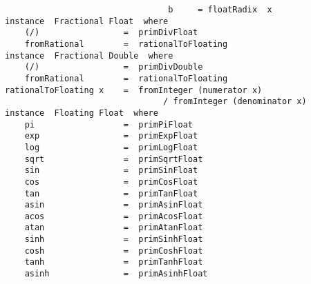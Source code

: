 \mbox{\tt \ \ \ \ \ \ \ \ \ \ \ \ \ \ \ \ \ \ \ \ \ \ \ \ \ \ \ \ \ \ \ \ \ b\ \ \ \ \ =\ floatRadix\ \ x}
\eprogB\noindent\bprogB
\mbox{\tt instance\ \ Fractional\ Float\ \ where}\\
\mbox{\tt \ \ \ \ (/)\ \ \ \ \ \ \ \ \ \ \ \ \ \ \ \ \ =\ \ primDivFloat}\\
\mbox{\tt \ \ \ \ fromRational\ \ \ \ \ \ \ \ =\ \ rationalToFloating}
\eprogB\noindent\bprogB
\mbox{\tt instance\ \ Fractional\ Double\ \ where}\\
\mbox{\tt \ \ \ \ (/)\ \ \ \ \ \ \ \ \ \ \ \ \ \ \ \ \ =\ \ primDivDouble}\\
\mbox{\tt \ \ \ \ fromRational\ \ \ \ \ \ \ \ =\ \ rationalToFloating}
\eprogB\noindent\bprogB
\mbox{\tt rationalToFloating\ x\ \ \ \ =\ \ fromInteger\ (numerator\ x)}\\
\mbox{\tt \ \ \ \ \ \ \ \ \ \ \ \ \ \ \ \ \ \ \ \ \ \ \ \ \ \ \ \ \ \ \ \ /\ fromInteger\ (denominator\ x)}
\eprogB\noindent\bprogB
\mbox{\tt instance\ \ Floating\ Float\ \ where}\\
\mbox{\tt \ \ \ \ pi\ \ \ \ \ \ \ \ \ \ \ \ \ \ \ \ \ \ =\ \ primPiFloat}\\
\mbox{\tt \ \ \ \ exp\ \ \ \ \ \ \ \ \ \ \ \ \ \ \ \ \ =\ \ primExpFloat}\\
\mbox{\tt \ \ \ \ log\ \ \ \ \ \ \ \ \ \ \ \ \ \ \ \ \ =\ \ primLogFloat}\\
\mbox{\tt \ \ \ \ sqrt\ \ \ \ \ \ \ \ \ \ \ \ \ \ \ \ =\ \ primSqrtFloat}\\
\mbox{\tt \ \ \ \ sin\ \ \ \ \ \ \ \ \ \ \ \ \ \ \ \ \ =\ \ primSinFloat}\\
\mbox{\tt \ \ \ \ cos\ \ \ \ \ \ \ \ \ \ \ \ \ \ \ \ \ =\ \ primCosFloat}\\
\mbox{\tt \ \ \ \ tan\ \ \ \ \ \ \ \ \ \ \ \ \ \ \ \ \ =\ \ primTanFloat}\\
\mbox{\tt \ \ \ \ asin\ \ \ \ \ \ \ \ \ \ \ \ \ \ \ \ =\ \ primAsinFloat}\\
\mbox{\tt \ \ \ \ acos\ \ \ \ \ \ \ \ \ \ \ \ \ \ \ \ =\ \ primAcosFloat}\\
\mbox{\tt \ \ \ \ atan\ \ \ \ \ \ \ \ \ \ \ \ \ \ \ \ =\ \ primAtanFloat}\\
\mbox{\tt \ \ \ \ sinh\ \ \ \ \ \ \ \ \ \ \ \ \ \ \ \ =\ \ primSinhFloat}\\
\mbox{\tt \ \ \ \ cosh\ \ \ \ \ \ \ \ \ \ \ \ \ \ \ \ =\ \ primCoshFloat}\\
\mbox{\tt \ \ \ \ tanh\ \ \ \ \ \ \ \ \ \ \ \ \ \ \ \ =\ \ primTanhFloat}\\
\mbox{\tt \ \ \ \ asinh\ \ \ \ \ \ \ \ \ \ \ \ \ \ \ =\ \ primAsinhFloat}\\
